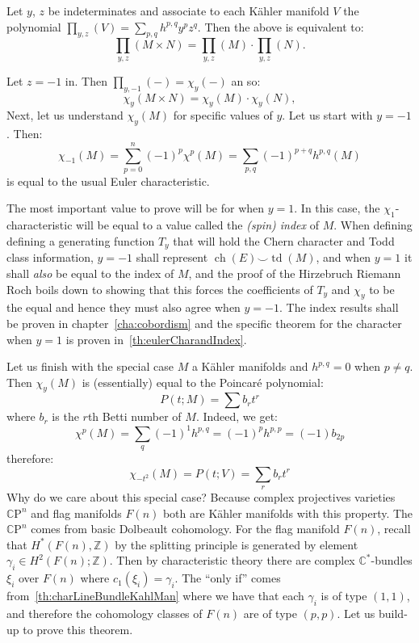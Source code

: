 \documentclass{book}
\newcommand{\C}{{\mathbb{C}}}
\newcommand{\Z}{{\mathbb{Z}}}
\newcommand{\CP}{\mathbb{C}\mathrm{P}}
\newcommand{\ch}{{\operatorname{ch}}}
\newcommand{\td}{{\operatorname{td}}}
\begin{document}
Let $y$, $z$ be indeterminates and associate to each K\"ahler manifold $V$ the polynomial $\prod_{y,z}(V)
= \sum_{p,q} h^{p,q} y^p z^q$. Then the above is equivalent to:
\[
    \prod_{y,z}(M \times N) = \prod_{y,z}(M) \cdot \prod_{y,z}(N).
\]

Let $z = -1$ in. Then $\prod_{y,-1}(-) = \chi_y(-)$ an so:
\[
    \chi_y(M \times N) = \chi_y(M) \cdot \chi_y(N),
\]
Next, let us understand $\chi_y(M)$ for specific values of $y$. Let us start with $y = -1$. Then:
\[
  \chi_{-1}(M) = \sum_{p=0}^n (-1)^p\chi^p(M) = \sum_{p,q} (-1)^{p+q} h^{p,q}(M)
\]
is equal to the usual Euler characteristic.

The most important value to prove will be for when $y = 1$. In this case, the $\chi_{1}$-characteristic will
be equal to a value called the \emph{(spin) index} of $M$. When defining defining a generating function $T_y$ that
will hold the Chern character and Todd class information, $y = -1$ shall represent $\ch(E)\smile \td(M)$, and when $y = 1$ it shall \emph{also} be equal to the
index of $M$, and the proof of the Hirzebruch Riemann Roch boils down to showing that this forces the
coefficients of $T_y$ and $\chi_y$ to be the equal and hence they must also agree when $y = -1$. The index results
shall be proven in chapter~\ref{cha:cobordism} and the specific theorem for the character when $y=1$ is proven
in~\cref{th:eulerCharandIndex}.




Let us finish with the special case $M$ a K\"ahler manifolds and $h^{p,q} = 0$ when $p\ne q$. Then $\chi_y(M)$
is (essentially) equal to the Poincar\'e polynomial:
\[
  P(t; M) = \sum b_rt^r
\]
where $b_r$ is the $r$th Betti number of $M$. Indeed, we get:
\[
  \chi^p(M) = \sum_q (-1)^1 h^{p,q} = (-1)^p h^{p,p} = (-1)b_{2p}
\]
therefore:
\[
  \chi_{-t^2}(M) = P(t;V) = \sum_r b_rt^r
\]
Why do we care about this special case? Because complex projectives varieties $\CP^n$ and flag manifolds
$F(n)$ both are K\"ahler manifolds with this property. The $\CP^n$ comes from basic Dolbeault cohomology. For
the flag manifold $F(n)$, recall that $H^*(F(n), \Z)$ by the splitting principle is generated by element
$\gamma_i \in H^2(F(n); \Z)$. Then by characteristic theory there are complex $\C^*$-bundles $\xi_i$ over
$F(n)$ where $c_1(\xi_i) = \gamma_i$. The ``only if'' comes from~\cref{th:charLineBundleKahlMan} where we have
that each $\gamma_i$ is of type $(1,1)$, and therefore the cohomology classes of $F(n)$ are of type $(p,p)$.
Let us build-up to prove this theorem.
\end{document}
